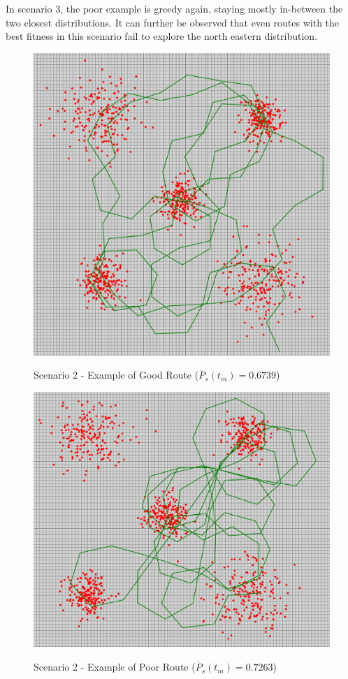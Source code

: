 \documentclass[10pt,a4paper, oneside, conference]{IEEEtran}
\begin{document}
In scenario 3, the poor example is greedy again, staying mostly in-between the two closest distributions. It can further be observed that even routes with the best fitness in this scenario fail to explore the north eastern distribution.
		
\begin{figure}[t]
	\caption{Scenario 2 - Example of Good Route ($\overline{P}_s(t_m)=0.6739$)}
	\includegraphics[width=0.7\linewidth]{goodRouteScenario2.png}
	\centering
	\label{fig:scenario2Good}	
	\end{figure}	
	
	\begin{figure}[t]
	\caption{Scenario 2 - Example of Poor Route ($\overline{P}_s(t_m)=0.7263$)}
	\includegraphics[width=0.7\linewidth]{poorRouteScenario2.png}
	\centering
	\label{fig:scenario2Poor}	
	\end{figure}	
	
\end{document}
